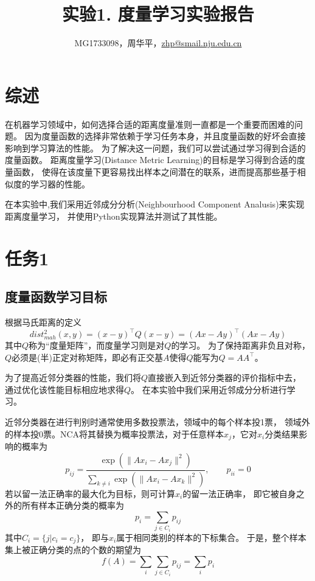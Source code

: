 \documentclass[a4paper,UTF8]{article}
\theoremstyle{definition}
\begin{document}
\title{实验1. 度量学习实验报告}
\author{MG1733098，周华平，\url{zhp@smail.nju.edu.cn}}
\maketitle

\section*{综述}

在机器学习领域中，如何选择合适的距离度量准则一直都是一个重要而困难的问题。
因为度量函数的选择非常依赖于学习任务本身，并且度量函数的好坏会直接影响到学习算法的性能。
为了解决这一问题，我们可以尝试通过学习得到合适的度量函数。
距离度量学习(Distance Metric Learning)的目标是学习得到合适的度量函数，
使得在该度量下更容易找出样本之间潜在的联系，进而提高那些基于相似度的学习器的性能。

在本实验中,我们采用近邻成分分析(Neighbourhood Component Analusis)来实现距离度量学习，
并使用Python实现算法并测试了其性能。

\section*{任务1}

\subsection*{度量函数学习目标}

根据马氏距离的定义
\[
	dist_{mah}^2(x, y) = (x - y)^\top Q(x - y) = (Ax - Ay)^\top (Ax - Ay)
\]
其中$Q$称为“度量矩阵”，而度量学习则是对$Q$的学习。
为了保持距离非负且对称，$Q$必须是(半)正定对称矩阵，即必有正交基$A$使得$Q$能写为$Q = AA^\top$。

为了提高近邻分类器的性能，我们将$Q$直接嵌入到近邻分类器的评价指标中去，
通过优化该性能目标相应地求得$Q$。
在本实验中我们采用近邻成分分析进行学习。

近邻分类器在进行判别时通常使用多数投票法，领域中的每个样本投1票，
领域外的样本投0票。NCA将其替换为概率投票法，对于任意样本$x_{j}$，它对$x_{i}$分类结果影响的概率为
\[
	p_{ij} = \frac{\exp(\lVert Ax_{i} - Ax_{j} \rVert^2)}
	{\sum_{k \neq i} \exp(\lVert Ax_{i} - Ax_{k} \rVert^2)}, \qquad
	p_{ii} = 0
\]
若以留一法正确率的最大化为目标，则可计算$x_{i}$的留一法正确率，
即它被自身之外的所有样本正确分类的概率为
\[
	p_{i} = \sum_{j \in C_{i}} p_{ij}
\]
其中$C_{i} = \lbrace j \vert c_{i} = c_{j} \rbrace$，
即与$x_{i}$属于相同类别的样本的下标集合。
于是，整个样本集上被正确分类的点的个数的期望为
\[
	f(A) = \sum_{i} \sum_{j \in C_{i}} p_{ij} = \sum_{i} p_{i}
\]
\end{document}
